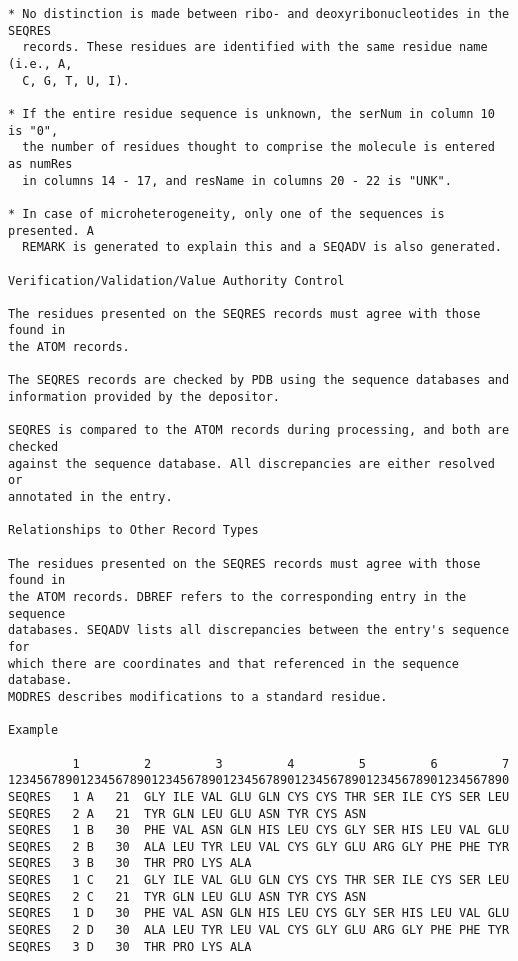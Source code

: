 \begin{lstlisting}
* No distinction is made between ribo- and deoxyribonucleotides in the SEQRES
  records. These residues are identified with the same residue name (i.e., A,
  C, G, T, U, I). 

* If the entire residue sequence is unknown, the serNum in column 10 is "0",
  the number of residues thought to comprise the molecule is entered as numRes
  in columns 14 - 17, and resName in columns 20 - 22 is "UNK". 

* In case of microheterogeneity, only one of the sequences is presented. A
  REMARK is generated to explain this and a SEQADV is also generated. 

Verification/Validation/Value Authority Control 

The residues presented on the SEQRES records must agree with those found in
the ATOM records. 

The SEQRES records are checked by PDB using the sequence databases and
information provided by the depositor. 

SEQRES is compared to the ATOM records during processing, and both are checked
against the sequence database. All discrepancies are either resolved or
annotated in the entry. 

Relationships to Other Record Types 

The residues presented on the SEQRES records must agree with those found in
the ATOM records. DBREF refers to the corresponding entry in the sequence
databases. SEQADV lists all discrepancies between the entry's sequence for
which there are coordinates and that referenced in the sequence database.
MODRES describes modifications to a standard residue. 

Example 

         1         2         3         4         5         6         7
1234567890123456789012345678901234567890123456789012345678901234567890
SEQRES   1 A   21  GLY ILE VAL GLU GLN CYS CYS THR SER ILE CYS SER LEU
SEQRES   2 A   21  TYR GLN LEU GLU ASN TYR CYS ASN                    
SEQRES   1 B   30  PHE VAL ASN GLN HIS LEU CYS GLY SER HIS LEU VAL GLU
SEQRES   2 B   30  ALA LEU TYR LEU VAL CYS GLY GLU ARG GLY PHE PHE TYR
SEQRES   3 B   30  THR PRO LYS ALA                                    
SEQRES   1 C   21  GLY ILE VAL GLU GLN CYS CYS THR SER ILE CYS SER LEU
SEQRES   2 C   21  TYR GLN LEU GLU ASN TYR CYS ASN                    
SEQRES   1 D   30  PHE VAL ASN GLN HIS LEU CYS GLY SER HIS LEU VAL GLU
SEQRES   2 D   30  ALA LEU TYR LEU VAL CYS GLY GLU ARG GLY PHE PHE TYR
SEQRES   3 D   30  THR PRO LYS ALA                                    


\end{lstlisting}
